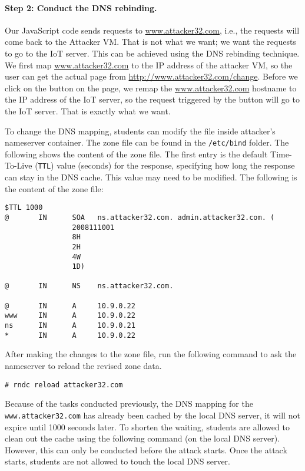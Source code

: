 \paragraph{Step 2: Conduct the DNS rebinding.}
Our JavaScript code sends requests to \url{www.attacker32.com}, 
i.e., the requests will come back to the Attacker VM. That is not 
what we want; we want the requests to go to the IoT server. 
This can be achieved using the DNS rebinding 
technique. We first map \url{www.attacker32.com} to the IP address of the attacker VM, so
the user can get the actual page from \url{http://www.attacker32.com/change}. 
Before we click on the button on the page, we remap
the \url{www.attacker32.com} hostname to the IP address of the IoT server, so
the request triggered by the button will go to the IoT server. That is exactly what 
we want. 


To change the DNS mapping, students can modify the 
 file inside attacker's nameserver container.
The zone file can be found in 
the \texttt{/etc/bind} folder. 
The following shows the content of the zone file. The first 
entry is the default Time-To-Live (\texttt{TTL}) value (seconds) 
for the response, specifying how long the response can stay in
the DNS cache. This value may need to be modified. 
The following is the content of the zone file:

\begin{lstlisting}
$TTL 1000
@       IN      SOA   ns.attacker32.com. admin.attacker32.com. (
                2008111001
                8H
                2H
                4W
                1D)

@       IN      NS    ns.attacker32.com.

@       IN      A     10.9.0.22
www     IN      A     10.9.0.22
ns      IN      A     10.9.0.21
*       IN      A     10.9.0.22
\end{lstlisting}


After making the changes to the zone file, 
run the following command to ask the nameserver 
to reload the revised zone data. 

\begin{lstlisting}
# rndc reload attacker32.com
\end{lstlisting}



Because of the tasks conducted previously, the DNS mapping for the 
\texttt{www.attacker32.com} has already been cached by the local
DNS server, it will not expire until 1000 seconds later.  To 
shorten the waiting, students are allowed to clean out the cache using the 
following command (on the local DNS server). However, this can only be 
conducted before the attack starts. Once the attack starts, students 
are not allowed to touch the local DNS server. 


